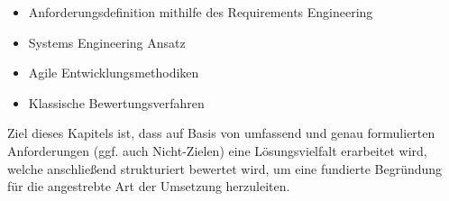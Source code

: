 \begin{itemize}
\item Anforderungsdefinition mithilfe des Requirements Engineering  \autocite{Pohl.2021}
\item Systems Engineering Ansatz \autocite{Schluter.2023}
\item Agile Entwicklungsmethodiken \autocite{Cohn.2010, Martin.2020, Wirdemann.2022}
\item Klassische Bewertungsverfahren \autocite{Breiing.1997, Zangemeister.2014}
\end{itemize}

Ziel dieses Kapitels ist, dass auf Basis von umfassend und genau formulierten Anforderungen (ggf. auch Nicht-Zielen) eine Lösungsvielfalt erarbeitet wird, welche anschließend strukturiert bewertet wird, um eine fundierte Begründung für die angestrebte Art der Umsetzung herzuleiten.